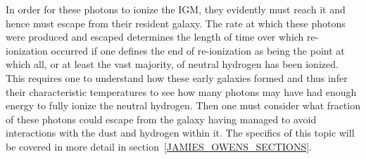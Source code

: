 	In order for these photons to ionize the IGM, they evidently must reach it and hence must escape from their resident galaxy. The rate at which these photons were produced and escaped determines the length of time over which re-ionization occurred if one defines the end of re-ionization as being the point at which all, or at least the vast majority, of neutral hydrogen has been ionized. This requires one to understand how these early galaxies formed and thus infer their characteristic temperatures to see how many photons may have had enough energy to fully ionize the neutral hydrogen. Then one must consider what fraction of these photons could escape from the galaxy having managed to avoid interactions with the dust and hydrogen within it. The specifics of this topic will be covered in more detail in section~\ref{JAMIES_OWENS_SECTIONS}.

